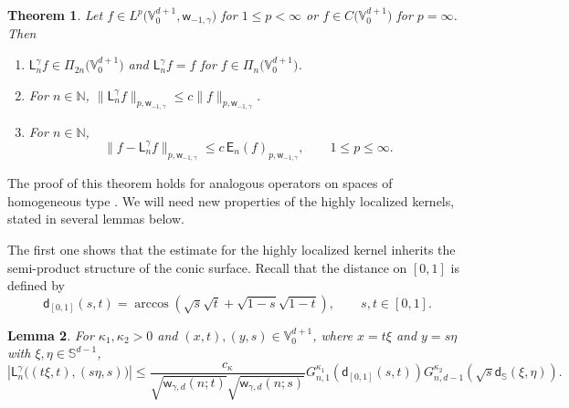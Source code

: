 \documentclass{amsart}
\newtheorem{thm}{Theorem}[section]
\newtheorem{lem}[thm]{Lemma}
\theoremstyle{remark}
\def\sph{{\mathbb{S}^{d-1}}}
\def\g{{\gamma}}
\def\k{{\kappa}}
\def\NN{{\mathbb N}}
\def\SS{{\mathbb S}}
\def\VV{{\mathbb V}}
\def\sph{{\mathbb{S}^{d-1}}}
\def\sE{{\mathsf E}}
\def\sL{{\mathsf L}}
\def\sd{{\mathsf d}}
\def\sw{{\mathsf w}}
\def\g{{\gamma}}
\def\k{{\kappa}}
\def\NN{{\mathbb N}}
\def\SS{{\mathbb S}}
\def\VV{{\mathbb V}}
\begin{document}
\begin{thm}\label{thm:near-bestCS}
Let $f \in L^p\big(\VV_0^{d+1}, \sw_{-1,\g}\big)$ for $1 \le p < \infty$ or $f\in C\big(\VV_0^{d+1}\big)$ for $p = \infty$. Then
\begin{enumerate}[\rm (i)]
\item $\sL^\g_nf \in  \Pi_{2n}\big(\VV_0^{d+1}\big)$ and $\sL^\g_nf= f$ for $f \in \Pi_n\big(\VV_0^{d+1}\big)$.
\item For $n \in \NN$, $\|\sL^\g_n f\|_{p,\sw_{-1,\g}} \le c \|f\|_{p,\sw_{-1,\g}}$.
\item For $n \in \NN$, 
\begin{equation}\label{eqn-2.16}
\|f- \sL^\g_nf\|_{p,\sw_{-1,\g}} \le c\, \sE_n(f)_{p,\sw_{-1,\g}}, \qquad 1 \le p \le \infty.
\end{equation}
\end{enumerate}
\end{thm}

The proof of this theorem holds for analogous operators on spaces of homogeneous type \cite[Theorem 3.14]{X21}. 
We will need new properties of the highly localized kernels, stated in several lemmas below.  

The first one shows that the estimate for the highly localized kernel inherits the semi-product structure of the 
conic surface. Recall that the distance on $[0,1]$ is defined by
$$
\sd_{[0,1]}(s,t) = \arccos \left( \sqrt{s}\sqrt{t} + \sqrt{1-s} \sqrt{1-t} \right), \qquad s, t \in [0,1]. 
$$

\begin{lem} \label{lem:key_lem2}
For \(\k_1,\k_2 > 0\) and \((x,t), (y,s) \in \VV_0^{d+1}\), where \(x = t\xi\) and \(y = s\eta\) with \(\xi, \eta \in \sph\), 
$$
  \left| \sL_n^\g \big((t\xi,t),(s \eta,s) \big)\right| \le  \frac{c_\k}{\sqrt{\sw_{\g,d}(n;t)}\sqrt{\sw_{\g,d}(n;s)}} G_{n,1}^{\k_1}\!\left(\sd_{[0,1]}(s,t)\right) 
      G_{n,d-1}^{\k_2}\!\left(\sqrt{s} \sd_{\SS}(\xi,\eta)\right).  
$$
\end{lem}
\end{document}
